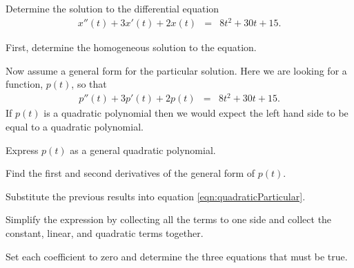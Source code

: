   \begin{problem}

    \item Determine the solution to the differential equation
      \begin{eqnarray}
        x''(t) + 3x'(t) + 2x(t) & = & 8 t^2 + 30t + 15.
      \end{eqnarray}

      \begin{subproblem}
        \item First, determine the homogeneous solution to the
          equation.

          \vfill

        \item Now assume a general form for the particular
          solution. Here we are looking for a function, $p(t)$, so
          that 
          \begin{eqnarray}
            p''(t) + 3p'(t) + 2p(t) & = & 8 t^2 + 30t + 15.
            \label{eqn:quadraticParticular}
          \end{eqnarray}
          If $p(t)$ is a quadratic polynomial then we would expect the
          left hand side to be equal to a quadratic polynomial.

          Express $p(t)$ as a general quadratic polynomial.

          \vspace*{4em}

        \item Find the first and second derivatives of the general
          form of $p(t)$.

          \vfill

          \clearpage

        \item Substitute the previous results into equation
          \ref{eqn:quadraticParticular}.

          \vfill

        \item Simplify the expression by collecting all the terms to
          one side and collect the constant, linear, and quadratic
          terms together.

          \vfill

        \item Set each coefficient to zero and determine the three
          equations that must be true.

          \vfill


\end{subproblem}
\end{problem}
